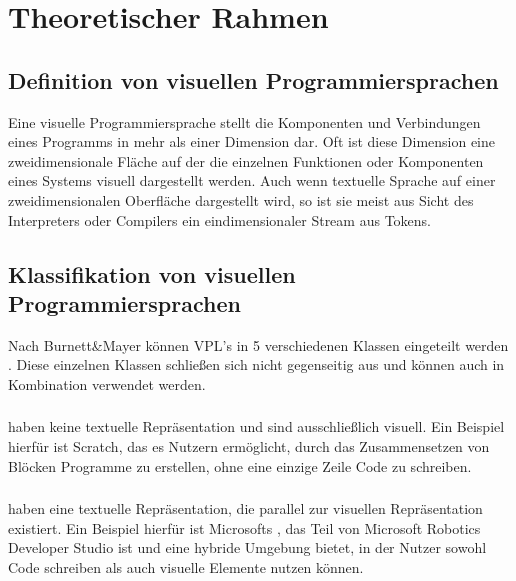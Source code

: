 \documentclass[ngerman]{article}
\begin{document}
\section{Theoretischer Rahmen}

\subsection{Definition von visuellen Programmiersprachen}
Eine visuelle Programmiersprache stellt die Komponenten und Verbindungen eines Programms in mehr als einer Dimension dar. Oft ist diese Dimension eine zweidimensionale Fläche auf der die einzelnen Funktionen oder Komponenten eines Systems visuell dargestellt werden. 
Auch wenn textuelle Sprache auf einer zweidimensionalen Oberfläche dargestellt wird, so ist sie meist aus Sicht des Interpreters oder Compilers ein eindimensionaler Stream aus Tokens. \cite{Myers}

\subsection{Klassifikation von visuellen Programmiersprachen}

Nach Burnett\&Mayer können VPL's in 5 verschiedenen Klassen eingeteilt werden \cite{BURNETT1994287}. Diese einzelnen Klassen schließen sich nicht gegenseitig aus und können auch in Kombination verwendet werden.

\subsubsection{}
 haben keine textuelle Repräsentation und sind ausschließlich visuell. Ein Beispiel hierfür ist Scratch, das es Nutzern ermöglicht, durch das Zusammensetzen von Blöcken Programme zu erstellen, ohne eine einzige Zeile Code zu schreiben. \cite{mitScratchAbout}

\subsubsection{}
 haben eine textuelle Repräsentation, die parallel zur visuellen Repräsentation existiert. 
Ein Beispiel hierfür ist Microsofts , das Teil von Microsoft Robotics Developer Studio ist und eine hybride Umgebung bietet, in der Nutzer sowohl Code schreiben als auch visuelle Elemente nutzen können. \cite{microsoftIntroduction}
\end{document}
